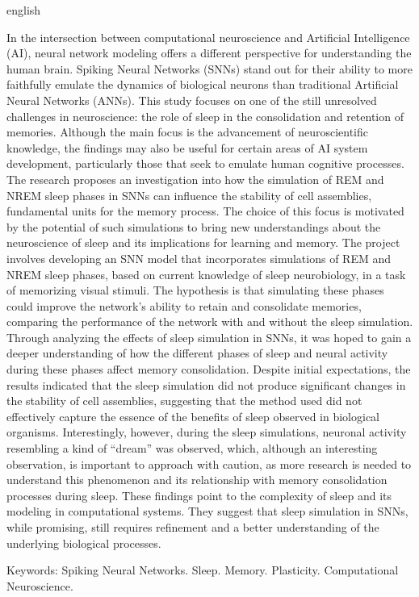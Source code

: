 \begin{resumo}[Abstract]	
\begin{otherlanguage*}{english}
\noindent 
 
In the intersection between computational neuroscience and Artificial Intelligence (AI), neural network modeling offers a
different perspective for understanding the human brain. Spiking Neural Networks (SNNs) stand out for their ability to more
faithfully emulate the dynamics of biological neurons than traditional Artificial Neural Networks (ANNs). This study focuses on
one of the still unresolved challenges in neuroscience: the role of sleep in the consolidation and retention of memories. Although
the main focus is the advancement of neuroscientific knowledge, the findings may also be useful for certain areas of AI system
development, particularly those that seek to emulate human cognitive processes. The research proposes an investigation into how
the simulation of REM and NREM sleep phases in SNNs can influence the stability of cell assemblies, fundamental units for the
memory process. The choice of this focus is motivated by the potential of such simulations to bring new understandings about the
neuroscience of sleep and its implications for learning and memory. The project involves developing an SNN model that incorporates
simulations of REM and NREM sleep phases, based on current knowledge of sleep neurobiology, in a task of memorizing visual
stimuli. The hypothesis is that simulating these phases could improve the network's ability to retain and consolidate memories,
comparing the performance of the network with and without the sleep simulation. Through analyzing the effects of sleep simulation
in SNNs, it was hoped to gain a deeper understanding of how the different phases of sleep and neural activity during these phases
affect memory consolidation. Despite initial expectations, the results indicated that the sleep simulation did not produce
significant changes in the stability of cell assemblies, suggesting that the method used did not effectively capture the
essence of the benefits of sleep observed in biological organisms. Interestingly, however, during the sleep simulations, neuronal
activity resembling a kind of ``dream'' was observed, which, although an interesting observation, is important to approach with
caution, as more research is needed to understand this phenomenon and its relationship with memory consolidation processes during
sleep. These findings point to the complexity of sleep and its modeling in computational systems. They suggest that sleep
simulation in SNNs, while promising, still requires refinement and a better understanding of the underlying biological processes.

\vspace{0.2cm}
Keywords: Spiking Neural Networks. Sleep. Memory. Plasticity. Computational Neuroscience.
\end{otherlanguage*}
\end{resumo}

